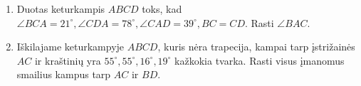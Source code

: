 \begin{enumerate}
\item Duotas keturkampis $ABCD$ toks, kad $\angle BCA=21^\circ,
  \angle CDA=78^\circ, \angle CAD=39^\circ, BC=CD$. Rasti $\angle 
  BAC$.
  
\item Iškilajame keturkampyje $ABCD$, kuris nėra trapecija,
  kampai tarp įstrižainės $AC$ ir kraštinių yra $55^\circ,
  55^\circ, 16^\circ, 19^\circ$ kažkokia tvarka.  Rasti
  visus įmanomus smailius kampus tarp $AC$ ir $BD$. 

\end{enumerate}
